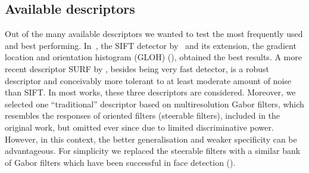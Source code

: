 \documentclass[preprint,authoryear,review]{elsarticle}
\newcommand{\commentNK}[1]{{\bf NK: #1}}
\begin{document}
%
\subsection{Available descriptors}
%
Out of the many available descriptors we wanted to test the most
frequently used and best performing. In~\cite{MikSch:2005}, the SIFT
detector by~\cite{Low:2004} and its extension, the gradient location
and orientation histogram (GLOH) (\cite{MikSch:2005}), obtained the best
results.
A more recent descriptor SURF by \cite{BayEssTuy:2008},
besides being very fast detector, is a robust descriptor and
conceivably more tolerant to at least moderate amount of noise than
SIFT. In most works, these three descriptors are considered. Moreover, we selected one ``traditional''
descriptor based on multiresolution Gabor filters, which resembles the responses
of oriented filters (steerable filters),
included in the original work, but omitted ever since due to
limited discriminative power.
However, in this context,
the better generalisation and weaker specificity can be advantageous.
For simplicity we replaced the steerable
filters with a similar bank of Gabor filters which have been successful in face
detection (\cite{WisFelKru:1997}). %
\end{document}
